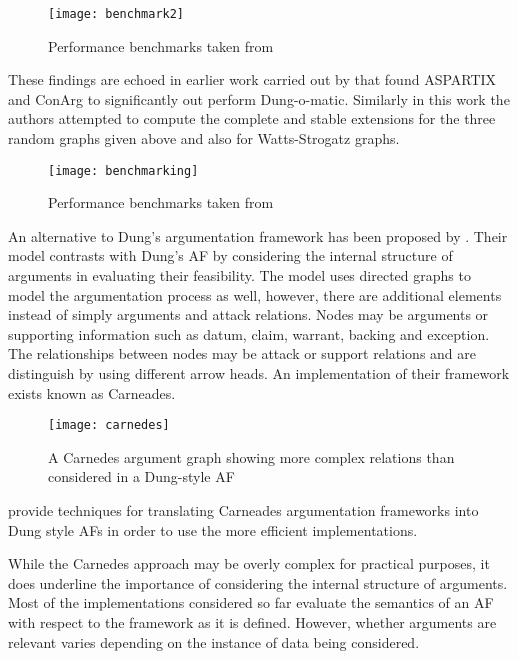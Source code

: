 \begin{figure}[!h]
\centering
\texttt{[image: benchmark2]}
\caption{Performance benchmarks taken from \cite{bistarelli2014benchmarking}}
\label{fig:my_label}
\end{figure}

These findings are echoed in earlier work carried out by \cite{bistarelli2013first} that found ASPARTIX and ConArg to significantly out perform Dung-o-matic. Similarly in this work the authors attempted to compute the complete and stable extensions for the three random graphs given above and also for Watts-Strogatz graphs. 

\begin{figure}[!h]
\centering
\texttt{[image: benchmarking]}
\caption{Performance benchmarks taken from \cite{bistarelli2013first}}
\label{fig:my_label}
\end{figure}

An alternative to Dung's argumentation framework has been proposed by \cite{gordon2007carneades}. Their model contrasts with Dung's AF by considering the internal structure of arguments in evaluating their feasibility. The model uses directed graphs to model the argumentation process as well, however, there are additional elements instead of simply arguments and attack relations. Nodes may be arguments or supporting information such as datum, claim, warrant, backing and exception. The relationships between nodes may be attack or support relations and are distinguish by using different arrow heads. An implementation of their framework exists known as Carneades.

\begin{figure}[!h]
\centering
\texttt{[image: carnedes]}
\caption{A Carnedes argument graph showing more complex relations than considered in a Dung-style AF}
\label{fig:my_label}
\end{figure}

\cite{van2014principled} provide techniques for translating Carneades argumentation frameworks into Dung style AFs in order to use the more efficient implementations.

While the Carnedes approach may be overly complex for practical purposes, it does underline the importance of considering the internal structure of arguments. Most of the implementations considered so far evaluate the semantics of an AF with respect to the framework as it is defined. However, whether arguments are relevant varies depending on the instance of data being considered.

